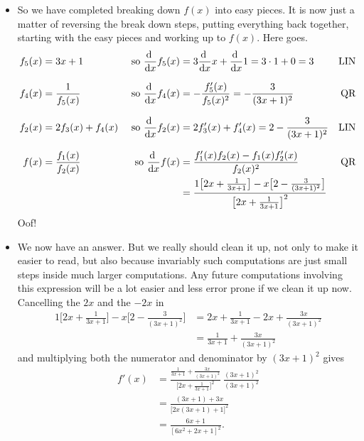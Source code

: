\begin{eg}
\begin{itemize}
\item So we have completed breaking down $f(x)$ into easy
pieces. It is now just a matter of reversing the break down steps,
putting everything back together, starting with the easy pieces
and working up to $f(x)$. Here goes.
\begin{align*}
f_5(x)&=3x+1 &\text{ so } \diff{}{x} f_5(x) &= 3\diff{}{x} x +\diff{}{x} 1
    =3\cdot 1+0 = 3 & \text{LIN} \\[0.1in]
f_4(x)&=\frac{1}{f_5(x)}
   &\text{ so } \diff{}{x} f_4(x)&=-\frac{f'_5(x)}{f_5(x)^2}=-\frac{3}{(3x+1)^2}
                    & \text{QR} \\[0.1in]
f_2(x)&=2f_3(x)+f_4(x) &\text{ so }
    \diff{}{x} f_2(x) &= 2f'_3(x)+ f'_4(x)=2-\frac{3}{(3x+1)^2}
                    & \text{LIN} \\[0.1in]
f(x)&=\frac{f_1(x)}{f_2(x)}&\text{ so }
     \diff{}{x} f(x)&=\frac{f'_1(x)f_2(x)-f_1(x)f'_2(x)}{f_2(x)^2}
                    & \text{QR} \\
    & &             &=\frac{1\big[2x+\frac{1}{3x+1}\big]
                            -x\big[2-\frac{3}{(3x+1)^2}\big]}
                       {\big[2x+\frac{1}{3x+1}\big]^2}
\end{align*}
Oof!
\item We now have an answer. But we really should clean it up, not only to make
it easier to read, but also because invariably such computations are
just small steps inside much larger computations. Any future computations
involving this expression will be a lot easier and less error prone
if we clean it up now.
Cancelling the $2x$ and the $-2x$ in
\begin{align*}
  1\big[2x+\frac{1}{3x+1}\big]
                            -x\big[2-\frac{3}{(3x+1)^2}\big]
&=2x+\frac{1}{3x+1} -2x+\frac{3x}{(3x+1)^2} \\
&=\frac{1}{3x+1}+\frac{3x}{(3x+1)^2}
\end{align*}
and multiplying both the numerator
and denominator by $(3x+1)^2$ gives
\begin{align*}
f'(x)&=\frac{\frac{1}{3x+1}+\frac{3x}{(3x+1)^2}}
                       {\big[2x+\frac{1}{3x+1}\big]^2}
\ \frac{(3x+1)^2}{(3x+1)^2} \\[0.1in]
&=\frac{(3x+1)+3x}{\big[2x(3x+1)+1\big]^2} \\[0.1in]
&=\frac{6x+1}{[6x^2+2x+1]^2}.
\end{align*}



\end{itemize}

\end{eg}

